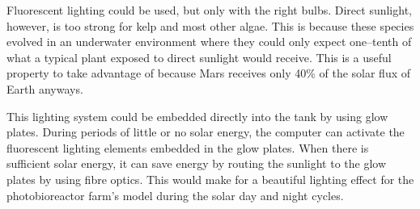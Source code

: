 Fluorescent lighting could be used, but only with the right bulbs. Direct sunlight, however, is too strong for kelp and most other algae. This is because these species evolved in an underwater environment where they could only expect one--tenth of what a typical plant exposed to direct sunlight would receive. This is a useful property to take advantage of because Mars receives only 40\% of the solar flux of Earth anyways. 

This lighting system could be embedded directly into the tank by using glow plates. During periods of little or no solar energy, the computer can activate the fluorescent lighting elements embedded in the glow plates. When there is sufficient solar energy, it can save energy by routing the sunlight to the glow plates by using fibre optics. This would make for a beautiful lighting effect for the photobioreactor farm's model during the solar day and night cycles.

